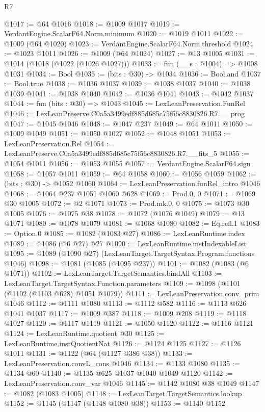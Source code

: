 \begin{lexlean}{R7}
\begin{coremodule}
@1017 := @64 @1016
@1018 := @1009 @1017
@1019 := VerdantEngine.ScalarF64.Norm.minimum
@1020 := @1019 @1011
@1022 := @1009 (@64 @1020)
@1023 := VerdantEngine.ScalarF64.Norm.threshold
@1024 := @1023 @1011
@1026 := @1009 (@64 @1024)
@1027 := @13 @1005
@1031 := @1014 (@1018 (@1022 (@1026 @1027)))
@1033 := fun (__s : @1004) => @1008 @1031
@1034 := Bool
@1035 := (bits : @30) -> @1034
@1036 := Bool.and
@1037 := Bool.true
@1038 := @1036 @1037
@1039 := @1038 @1037
@1040 := @1038 @1039
@1041 := @1038 @1040
@1042 := @1036 @1041
@1043 := @1042 @1037
@1044 := fun (bits : @30) => @1043
@1045 := LexLeanPreservation.FunRel
@1046 := LexLeanPreserve.C0a5a3499edf885d685c75f56c8830826.R7.__prog
@1047 := @1045 @1046
@1048 := @1047 @237
@1049 := @64 @1011
@1050 := @1009 @1049
@1051 := @1050 @1027
@1052 := @1048 @1051
@1053 := LexLeanPreservation.Rel
@1054 := LexLeanPreserve.C0a5a3499edf885d685c75f56c8830826.R7.__fits_5
@1055 := @1054 @1011
@1056 := @1053 @1055
@1057 := VerdantEngine.ScalarF64.sign
@1058 := @1057 @1011
@1059 := @64 @1058
@1060 := @1056 @1059
@1062 := (bits : @30) -> @1052 @1060
@1064 := LexLeanPreservation.funRel_intro @1046
@1068 := @1064 @237 @1051 @1060 @628
@1069 := Prod.{0, 0}
@1071 := @1069 @30 @1005
@1072 := @2 @1071
@1073 := Prod.mk.{0, 0}
@1075 := @1073 @30 @1005
@1076 := @1075 @38
@1078 := @1072 (@1076 @1049)
@1079 := @13 @1071
@1080 := @1078 @1079
@1081 := @1068 @1080
@1082 := Eq.refl.{1}
@1083 := Option.{0}
@1085 := @1082 (@1083 @27)
@1086 := LexLeanRuntime.index
@1089 := @1086 (@6 @27) @27
@1090 := LexLeanRuntime.instIndexableList
@1095 := @1089 (@1090 @27) (LexLeanTarget.TargetSyntax.Program.functions @1046)
@1098 := @1081 (@1085 (@1095 @237))
@1101 := @1082 (@1083 (@6 @1071))
@1102 := LexLeanTarget.TargetSemantics.bindAll
@1103 := LexLeanTarget.TargetSyntax.Function.parameters
@1109 := @1098 (@1101 (@1102 (@1103 @628) @1051 @1079))
@1111 := LexLeanPreservation.conv_prim @1046
@1112 := @1111 @1080
@1113 := @1112 @582
@1116 := @1113 @626 @1041 @1037
@1117 := @1009 @387
@1118 := @1009 @208
@1119 := @1118 @1027
@1120 := @1117 @1119
@1121 := @1050 @1120
@1122 := @1116 @1121
@1124 := LexLeanRuntime.quotient @30
@1125 := LexLeanRuntime.instQuotientNat
@1126 := @1124 @1125
@1127 := @1126 @1011
@1131 := @1122 (@64 (@1127 @386 @38))
@1133 := LexLeanPreservation.convL_cons @1046
@1134 := @1133 @1080
@1135 := @1134 @60
@1140 := @1135 @625 @1037 @1040 @1049 @1120
@1142 := LexLeanPreservation.conv_var @1046
@1145 := @1142 @1080 @38 @1049
@1147 := @1082 (@1083 @1005)
@1148 := LexLeanTarget.TargetSemantics.lookup
@1152 := @1145 (@1147 (@1148 @1080 @38))
@1153 := @1140 @1152

\end{coremodule}
\end{lexlean}
